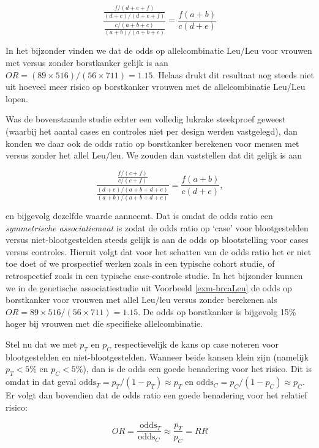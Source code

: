 \documentclass[
  dutch,
  letterpaper,
  12pt]{book}
\theoremstyle{definition}
\theoremstyle{definition}
\theoremstyle{definition}
\theoremstyle{remark}
\begin{document}
\begin{equation*}
\frac{ \frac{ f/(d+e+f)}{(d+e)/(d+e+f)} }{ \frac{c/(a+b+c)}{(a+b)/(a+b+c)}} = \frac{f(a+b)}{c (d+e)}
\end{equation*}

In het bijzonder vinden we dat de odds op allelcombinatie Leu/Leu voor
vrouwen met versus zonder borstkanker gelijk is aan
\(OR=(89\times 516)/(56\times 711)=1.15\). Helaas drukt dit resultaat
nog steeds niet uit hoeveel meer risico op borstkanker vrouwen met de
allelcombinatie Leu/Leu lopen.

Was de bovenstaande studie echter een volledig lukrake steekproef
geweest (waarbij het aantal cases en controles niet per design werden
vastgelegd), dan konden we daar ook de odds ratio op borstkanker
berekenen voor mensen met versus zonder het allel Leu/leu. We zouden dan
vaststellen dat dit gelijk is aan

\begin{equation*}
\frac{ \frac{ f/(c+f)}{c/(c+f)} }{ \frac{(d+e)/(a+b+d+e)}{(a+b)/(a+b+d+e)}} = \frac{f(a+b)}{c(d+e)},
\end{equation*}

en bijgevolg dezelfde waarde aanneemt. Dat is omdat de odds ratio een
\emph{symmetrische associatiemaat} is zodat de odds ratio op `case' voor
blootgestelden versus niet-blootgestelden steeds gelijk is aan de odds
op blootstelling voor cases versus controles. Hieruit volgt dat voor het
schatten van de odds ratio het er niet toe doet of we prospectief werken
zoals in een typische cohort studie, of retrospectief zoals in een
typische case-controle studie. In het bijzonder kunnen we in de
genetische associatiestudie uit Voorbeeld \ref{exm-brcaLeu} de odds op
borstkanker voor vrouwen met allel Leu/leu versus zonder berekenen als
\(OR=89\times 516/(56\times 711)=1.15\). De odds op borstkanker is
bijgevolg 15\% hoger bij vrouwen met die specifieke allelcombinatie.

Stel nu dat we met \(p_T\) en \(p_C\) respectievelijk de kans op case
noteren voor blootgestelden en niet-blootgestelden. Wanneer beide kansen
klein zijn (namelijk \(p_T<5\%\) en \(p_C<5\%\)), dan is de odds een
goede benadering voor het risico. Dit is omdat in dat geval
\(\mbox{odds}_T=p_T/(1-p_T)\approx p_T\) en
\(\mbox{odds}_C=p_C/(1-p_C)\approx p_C\). Er volgt dan bovendien dat de
odds ratio een goede benadering voor het relatief risico:

\begin{equation*}
OR=\frac{\mbox{ odds}_T}{\mbox{
odds}_C}\approx \frac{p_T}{p_C}=RR
\end{equation*}
\end{document}

